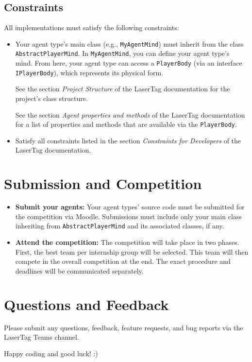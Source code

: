 \documentclass[a4paper,english,DIV=16,11pt,parskip=half,dvipsnames,listof=totoc,index=totoc,bibliography=totoc]{scrartcl}
\begin{document}
\subsection*{Constraints}
All implementations must satisfy the following constraints:
\begin{itemize}
  \item Your agent type's main class (e.g., \texttt{MyAgentMind}) must inherit from the class \texttt{AbstractPlayerMind}. In \texttt{MyAgentMind}, you can define your agent type's mind. From here, your agent type can access a \texttt{PlayerBody} (via an interface \texttt{IPlayerBody}), which represents its physical form.
  
  \faLightbulbO\: See the section \emph{Project Structure} of the LaserTag documentation for the project's class structure.
  
  \faLightbulbO\: See the section \emph{Agent properties and methods} of the LaserTag documentation for a list of properties and methods that are available via the \texttt{PlayerBody}.

  \item Satisfy all constraints listed in the section \emph{Constraints for Developers} of the LaserTag documentation.
\end{itemize}

\section*{Submission and Competition}

\begin{itemize}
  \item \textbf{Submit your agents:} Your agent types' source code must be submitted for the competition via Moodle. Submissions must include only your main class inheriting from \texttt{AbstractPlayerMind} and its associated classes, if any.
  \item \textbf{Attend the competition:} The competition will take place in two phases. First, the best team per internship group will be selected. This team will then compete in the overall competition at the end. The exact procedure and deadlines will be communicated separately.
\end{itemize}

\section*{Questions and Feedback}
Please submit any questions, feedback, feature requests, and bug reports via the LaserTag Teams channel.

Happy coding and good luck! :)

\end{document}
